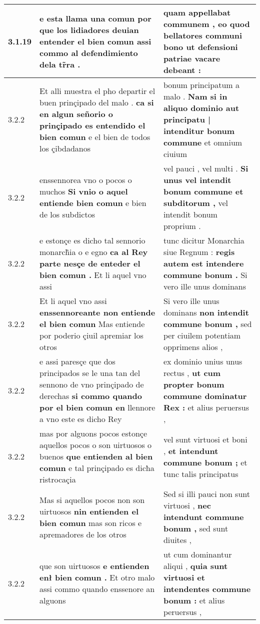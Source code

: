 \begin{tabular}{|p{1cm}|p{6.5cm}|p{6.5cm}|}
3.1.19 & e esta llama una comun \textbf{ por que los lidiadores deuian entender el bien comun } assi commo al defendimiento dela tr̃ra . & quam appellabat communem , \textbf{ eo quod bellatores communi bono } ut defensioni patriae vacare debeant : \\\hline
3.2.2 & Et alli muestra el pho departir el buen prinçipado del malo . \textbf{ ca si en algun señorio o prinçipado es entendido el bien comun } e el bien de todos los çibdadanos & bonum principatum a malo . \textbf{ Nam si in aliquo dominio aut principatu | intenditur bonum commune } et omnium ciuium \\\hline
3.2.2 & enssennorea vno o pocos o muchos \textbf{ Si vnio o aquel entiende bien comun } e bien de los subdictos & vel pauci , vel multi . \textbf{ Si unus vel intendit bonum commune et subditorum , } vel intendit bonum proprium . \\\hline
3.2.2 & e estonçe es dicho tal sennorio monarch̃ia o e egno \textbf{ ca al Rey parte nesçe de enteder el bien comun . } Et li aquel vno assi & tunc dicitur Monarchia siue Regnum : \textbf{ regis autem est intendere commune bonum . } Si vero ille unus dominans \\\hline
3.2.2 & Et li aquel vno assi \textbf{ enssennoreante non entiende el bien comun } Mas entiende por poderio çiuil apremiar los otros & Si vero ille unus dominans \textbf{ non intendit commune bonum , } sed per ciuilem potentiam opprimens alios , \\\hline
3.2.2 & e assi paresçe que dos principados se le una tan del sennono de vno prinçipado de derechas \textbf{ si commo quando por el bien comun en } llennore a vno este es dicho Rey & ex dominio unius unus rectus , \textbf{ ut cum propter bonum commune dominatur Rex : } et alius peruersus , \\\hline
3.2.2 & mas por alguons pocos estonçe aquellos pocos o son uirtuosos o buenos \textbf{ que entienden al bien comun } e tal prinçipado es dicħa ristrocaçia & vel sunt virtuosi et boni , \textbf{ et intendunt commune bonum ; } et tunc talis principatus \\\hline
3.2.2 & Mas si aquellos pocos non son uirtuosos \textbf{ nin entienden el bien comun } mas son ricos e apremadores de los otros & Sed si illi pauci non sunt virtuosi , \textbf{ nec intendunt commune bonum , } sed sunt diuites , \\\hline
3.2.2 & que son uirtuosos \textbf{ e entienden enł bien comun . } Et otro malo assi commo quando enssenore an alguons & ut cum dominantur aliqui , \textbf{ quia sunt virtuosi et intendentes commune bonum : } et alius peruersus , \\\hline

\end{tabular}
